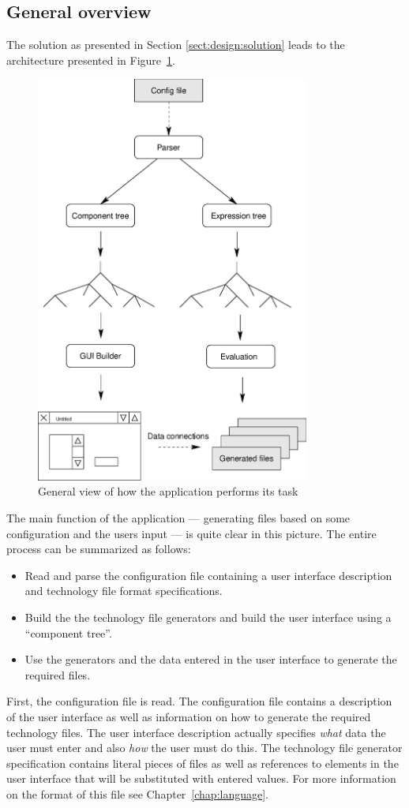 \subsection{General overview} \label{sect:design:overview}
The solution as presented in Section \ref{sect:design:solution} leads to the
architecture presented in \mbox{Figure \ref{fig:design:overview}}.
\begin{figure}
\begin{center}
    \includegraphics[width=9cm]{./figures/app_overview_new.eps}
    \caption{General view of how the application performs its task}
    \label{fig:design:overview}
\end{center} \end{figure}
The main function of the application --- generating files based on some
configuration and the users input --- is quite clear in this picture. The
entire process can be summarized as follows:
\begin{itemize}
\item Read and parse the configuration file containing a user interface
description and technology file format specifications.
\item Build the the technology file generators and build the user
interface using a ``component tree''.
\item Use the generators and the data entered in the user interface to generate
the required files.
\end{itemize}
First, the configuration file is read. The configuration file contains a
description of the user interface as well as information on how to generate the
required technology files. The user interface description actually specifies
\emph{what} data the user must enter and also \emph{how} the user must do this.
The technology file generator specification contains literal pieces of files as
well as references to elements in the user interface that will be substituted
with entered values. For more information on the format of this file see
\mbox{Chapter \ref{chap:language}}.

